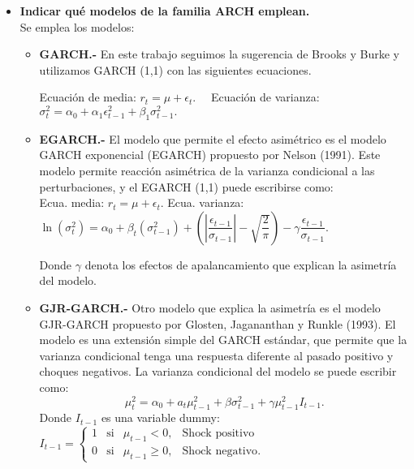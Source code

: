 \begin{itemize}
    \item \textbf{Indicar qué modelos de la familia ARCH emplean.}\\ 

	Se emplea los modelos:
	\begin{itemize}
	    \item \textbf{GARCH.-} En este trabajo seguimos la sugerencia de Brooks y Burke y utilizamos GARCH (1,1) con las siguientes ecuaciones.

	    \begin{center}
	    Ecuación de media: $r_t=\mu+\epsilon_t.\quad $
	    Ecuación de varianza: $\sigma_t^2=\alpha_0+\alpha_1\epsilon_{t-1}^2+\beta_1\sigma^2_{t-1}.$\\
	    \end{center}

	\item \textbf{EGARCH.-} El modelo que permite el efecto asimétrico es el modelo GARCH exponencial (EGARCH) propuesto por Nelson (1991). Este modelo permite reacción asimétrica de la varianza condicional a las perturbaciones, y el EGARCH (1,1) puede escribirse como:\\
	    Ecua. media:
	    $r_t=\mu+\epsilon_t.$
	    Ecua. varianza:
	    $\ln(\sigma_t^2)=\alpha_0+\beta_t\left(\sigma_{t-1}^2\right)+\left(\left|\dfrac{\epsilon_{t-1}}{\sigma_{t-1}}\right|-\sqrt{\dfrac{2}{\pi}}\right)-\gamma\dfrac{\epsilon_{t-1}}{\sigma_{t-1}}.$

	    Donde $\gamma$ denota los efectos de apalancamiento que explican la asimetría del modelo.\\

	\item \textbf{GJR-GARCH.-} Otro modelo que explica la asimetría es el modelo GJR-GARCH propuesto por Glosten, Jagananthan y Runkle (1993). El modelo es una extensión simple del GARCH estándar, que permite que la varianza condicional tenga una respuesta diferente al pasado positivo y choques negativos. La varianza condicional del modelo se puede escribir como:
	    $$\mu_t^2=\alpha_0+a_t \mu_{t-1}^2+\beta\sigma_{t-1}^2+\gamma \mu_{t-1}^2 I_{t-1}.$$
	    Donde $I_{t-1}$ es una variable dummy:
	    $
	    I_{t-1}=
	    \left\{
		\begin{array}{ccrl}
		    1&\mbox{si}&\mu_{t-1}<0, & \mbox{Shock positivo}\\
		    0&\mbox{si}&\mu_{t-1}\geq 0, & \mbox{Shock negativo}.
		\end{array}
	    \right.
	    $

	\end{itemize}


\end{itemize}
